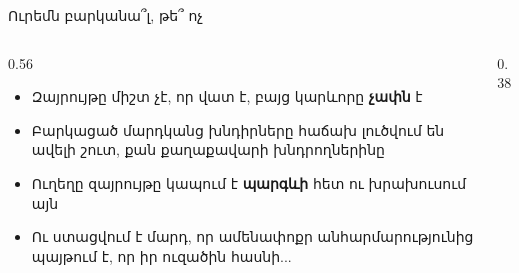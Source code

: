 \begin{frame}{Ուրեմն բարկանա՞լ, թե՞ ոչ}
  \begin{columns}[c]
    \begin{column}{0.56\textwidth}
      \begin{itemize}
        \item Զայրույթը միշտ չէ, որ վատ է, բայց կարևորը \textbf{չափն} է
        \item<2-> Բարկացած մարդկանց խնդիրները հաճախ լուծվում են ավելի շուտ, քան քաղաքավարի խնդրողներինը
        \item<3-> Ուղեղը զայրույթը կապում է \textbf{պարգևի} հետ ու խրախուսում այն
        \item<4-> Ու ստացվում է մարդ, որ ամենափոքր անհարմարությունից պայթում է, որ իր ուզածին հասնի...
      \end{itemize}
    \end{column}
    \begin{column}{0.38\textwidth}
      \centering
    \end{column}
  \end{columns}
\end{frame}
